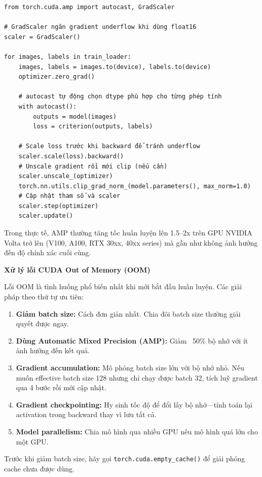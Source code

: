\begin{verbatim}
from torch.cuda.amp import autocast, GradScaler

# GradScaler ngăn gradient underflow khi dùng float16
scaler = GradScaler()

for images, labels in train_loader:
    images, labels = images.to(device), labels.to(device)
    optimizer.zero_grad()

    # autocast tự động chọn dtype phù hợp cho từng phép tính
    with autocast():
        outputs = model(images)
        loss = criterion(outputs, labels)

    # Scale loss trước khi backward để tránh underflow
    scaler.scale(loss).backward()
    # Unscale gradient rồi mới clip (nếu cần)
    scaler.unscale_(optimizer)
    torch.nn.utils.clip_grad_norm_(model.parameters(), max_norm=1.0)
    # Cập nhật tham số và scaler
    scaler.step(optimizer)
    scaler.update()
\end{verbatim}

Trong thực tế, AMP thường tăng tốc huấn luyện lên 1.5--2x trên GPU NVIDIA Volta trở lên (V100, A100, RTX 30xx, 40xx series) mà gần như không ảnh hưởng đến độ chính xác cuối cùng.

\begin{mdframed}[style=infobox]
\textbf{Xử lý lỗi CUDA Out of Memory (OOM)}

Lỗi OOM là tình huống phổ biến nhất khi mới bắt đầu huấn luyện. Các giải pháp theo thứ tự ưu tiên:

\begin{enumerate}
    \item \textbf{Giảm batch size:} Cách đơn giản nhất. Chia đôi batch size thường giải quyết được ngay.
    \item \textbf{Dùng Automatic Mixed Precision (AMP):} Giảm ~50\% bộ nhớ với ít ảnh hưởng đến kết quả.
    \item \textbf{Gradient accumulation:} Mô phỏng batch size lớn với bộ nhớ nhỏ. Nếu muốn effective batch size 128 nhưng chỉ chạy được batch 32, tích luỹ gradient qua 4 bước rồi mới cập nhật.
    \item \textbf{Gradient checkpointing:} Hy sinh tốc độ để đổi lấy bộ nhớ---tính toán lại activation trong backward thay vì lưu tất cả.
    \item \textbf{Model parallelism:} Chia mô hình qua nhiều GPU nếu mô hình quá lớn cho một GPU.
\end{enumerate}

Trước khi giảm batch size, hãy gọi \texttt{torch.cuda.empty\_cache()} để giải phóng cache chưa được dùng.
\end{mdframed}
